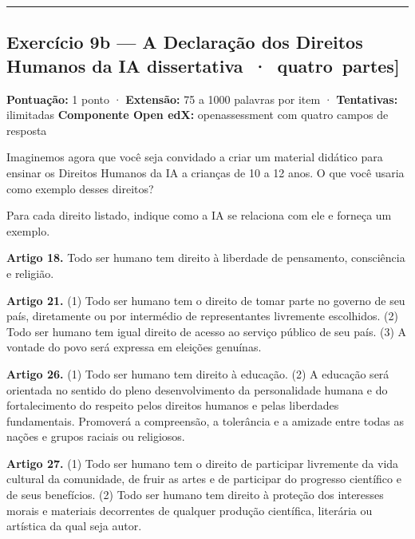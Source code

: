 \documentclass[
  11pt,
]{article}
\renewcommand{\texttt}[1]{{\color{iaAmeixa}\small\ttfamily #1}}
\begin{document}
\begin{center}\rule{0.5\linewidth}{0.5pt}\end{center}

\hypertarget{exercuxedcio-9b-a-declarauxe7uxe3o-dos-direitos-humanos-da-ia-dissertativa-quatro-partes}{%
\subsection{\texorpdfstring{Exercício 9b --- A Declaração dos Direitos
Humanos da IA
\texttt{{[}dissertativa\ ·\ quatro\ partes{]}}}{Exercício 9b --- A Declaração dos Direitos Humanos da IA {[}dissertativa · quatro partes{]}}}\label{exercuxedcio-9b-a-declarauxe7uxe3o-dos-direitos-humanos-da-ia-dissertativa-quatro-partes}}

\textbf{Pontuação:} 1 ponto · \textbf{Extensão:} 75 a 1000 palavras por
item · \textbf{Tentativas:} ilimitadas \textbf{Componente Open edX:}
\texttt{openassessment} com quatro campos de resposta

Imaginemos agora que você seja convidado a criar um material didático
para ensinar os Direitos Humanos da IA a crianças de 10 a 12 anos. O que
você usaria como exemplo desses direitos?

Para cada direito listado, indique como a IA se relaciona com ele e
forneça um exemplo.

\textbf{Artigo 18.} Todo ser humano tem direito à liberdade de
pensamento, consciência e religião.

\textbf{Artigo 21.} (1) Todo ser humano tem o direito de tomar parte no
governo de seu país, diretamente ou por intermédio de representantes
livremente escolhidos. (2) Todo ser humano tem igual direito de acesso
ao serviço público de seu país. (3) A vontade do povo será expressa em
eleições genuínas.

\textbf{Artigo 26.} (1) Todo ser humano tem direito à educação. (2) A
educação será orientada no sentido do pleno desenvolvimento da
personalidade humana e do fortalecimento do respeito pelos direitos
humanos e pelas liberdades fundamentais. Promoverá a compreensão, a
tolerância e a amizade entre todas as nações e grupos raciais ou
religiosos.

\textbf{Artigo 27.} (1) Todo ser humano tem o direito de participar
livremente da vida cultural da comunidade, de fruir as artes e de
participar do progresso científico e de seus benefícios. (2) Todo ser
humano tem direito à proteção dos interesses morais e materiais
decorrentes de qualquer produção científica, literária ou artística da
qual seja autor.
\end{document}
